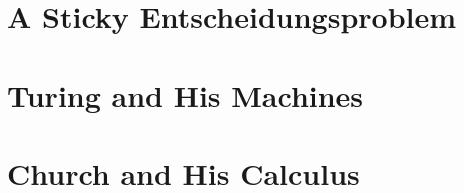 \label{background:beginnings}
\section[A Sticky \foreign{Entscheidungsproblem}]{A Sticky Entscheidungsproblem}

\section{Turing and His Machines}

\section{Church and His Calculus}
